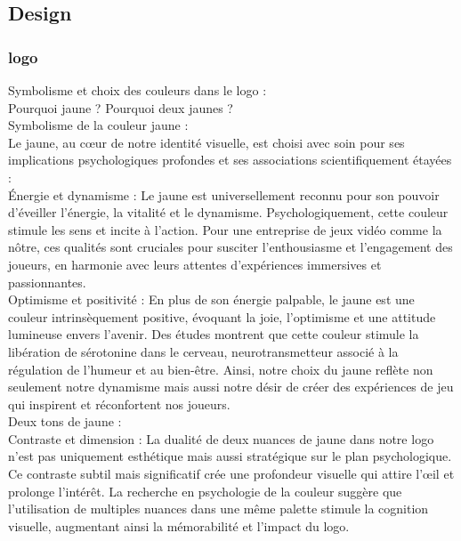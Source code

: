 \subsection{Design}

\subsubsection{logo}
Symbolisme et choix des couleurs dans le logo :
\\

Pourquoi jaune ? Pourquoi deux jaunes ? 
\\

Symbolisme de la couleur jaune : 
\\

Le jaune, au cœur de notre identité visuelle, est choisi avec soin pour ses implications psychologiques profondes et ses associations scientifiquement étayées : 
\\

Énergie et dynamisme : Le jaune est universellement reconnu pour son pouvoir d'éveiller l'énergie, la vitalité et le dynamisme. Psychologiquement, cette couleur stimule les sens et incite à l'action. Pour une entreprise de jeux vidéo comme la nôtre, ces qualités sont cruciales pour susciter l'enthousiasme et l'engagement des joueurs, en harmonie avec leurs attentes d'expériences immersives et passionnantes. 
\\

Optimisme et positivité : En plus de son énergie palpable, le jaune est une couleur intrinsèquement positive, évoquant la joie, l'optimisme et une attitude lumineuse envers l'avenir. Des études montrent que cette couleur stimule la libération de sérotonine dans le cerveau, neurotransmetteur associé à la régulation de l'humeur et au bien-être. Ainsi, notre choix du jaune reflète non seulement notre dynamisme mais aussi notre désir de créer des expériences de jeu qui inspirent et réconfortent nos joueurs. 
\\

Deux tons de jaune : 
\\

Contraste et dimension : La dualité de deux nuances de jaune dans notre logo n'est pas uniquement esthétique mais aussi stratégique sur le plan psychologique. Ce contraste subtil mais significatif crée une profondeur visuelle qui attire l'œil et prolonge l'intérêt. La recherche en psychologie de la couleur suggère que l'utilisation de multiples nuances dans une même palette stimule la cognition visuelle, augmentant ainsi la mémorabilité et l'impact du logo. 
\\

